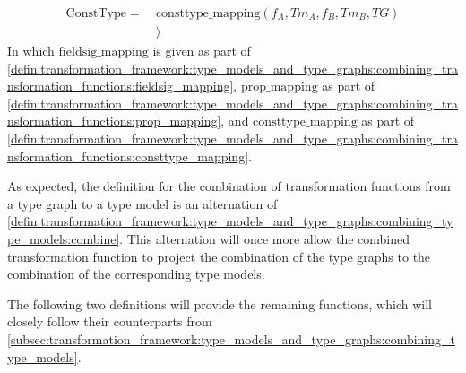 \begin{defin}
\begin{align*}
\mathrm{ConstType} =\ &\mathrm{consttype\_\!mapping}(f_A, Tm_A, f_B, Tm_B, TG) \\&
\rangle
\end{align*}
In which $\mathrm{fieldsig\_\!mapping}$ is given as part of \cref{defin:transformation_framework:type_models_and_type_graphs:combining_transformation_functions:fieldsig_mapping}, $\mathrm{prop\_\!mapping}$ as part of \cref{defin:transformation_framework:type_models_and_type_graphs:combining_transformation_functions:prop_mapping}, and $\mathrm{consttype\_\!mapping}$ as part of \cref{defin:transformation_framework:type_models_and_type_graphs:combining_transformation_functions:consttype_mapping}.
\end{defin}

As expected, the definition for the combination of transformation functions from a type graph to a type model is an alternation of \cref{defin:transformation_framework:type_models_and_type_graphs:combining_type_models:combine}. This alternation will once more allow the combined transformation function to project the combination of the type graphs to the combination of the corresponding type models.

The following two definitions will provide the remaining functions, which will closely follow their counterparts from \cref{subsec:transformation_framework:type_models_and_type_graphs:combining_type_models}.

